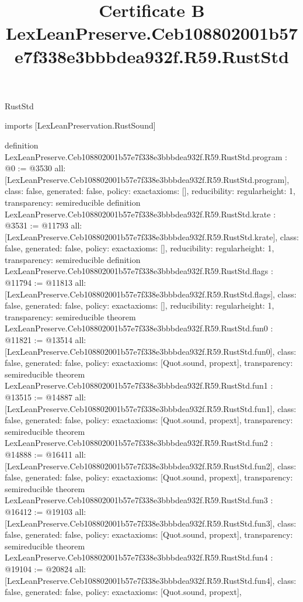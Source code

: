 \begin{lexlean}{RustStd}
\title{Certificate B LexLeanPreserve.Ceb108802001b57e7f338e3bbbdea932f.R59.RustStd}
\begin{coremodule}
imports [LexLeanPreservation.RustSound]

definition LexLeanPreserve.Ceb108802001b57e7f338e3bbbdea932f.R59.RustStd.program : @0 := @3530 {
  all: [LexLeanPreserve.Ceb108802001b57e7f338e3bbbdea932f.R59.RustStd.program],
  class: false,
  generated: false,
  policy: exact{axioms: []},
  reducibility: regular{height: 1},
  transparency: semireducible
}
definition LexLeanPreserve.Ceb108802001b57e7f338e3bbbdea932f.R59.RustStd.krate : @3531 := @11793 {
  all: [LexLeanPreserve.Ceb108802001b57e7f338e3bbbdea932f.R59.RustStd.krate],
  class: false,
  generated: false,
  policy: exact{axioms: []},
  reducibility: regular{height: 1},
  transparency: semireducible
}
definition LexLeanPreserve.Ceb108802001b57e7f338e3bbbdea932f.R59.RustStd.flags : @11794 := @11813 {
  all: [LexLeanPreserve.Ceb108802001b57e7f338e3bbbdea932f.R59.RustStd.flags],
  class: false,
  generated: false,
  policy: exact{axioms: []},
  reducibility: regular{height: 1},
  transparency: semireducible
}
theorem LexLeanPreserve.Ceb108802001b57e7f338e3bbbdea932f.R59.RustStd.fun0 : @11821 := @13514 {
  all: [LexLeanPreserve.Ceb108802001b57e7f338e3bbbdea932f.R59.RustStd.fun0],
  class: false,
  generated: false,
  policy: exact{axioms: [Quot.sound, propext]},
  transparency: semireducible
}
theorem LexLeanPreserve.Ceb108802001b57e7f338e3bbbdea932f.R59.RustStd.fun1 : @13515 := @14887 {
  all: [LexLeanPreserve.Ceb108802001b57e7f338e3bbbdea932f.R59.RustStd.fun1],
  class: false,
  generated: false,
  policy: exact{axioms: [Quot.sound, propext]},
  transparency: semireducible
}
theorem LexLeanPreserve.Ceb108802001b57e7f338e3bbbdea932f.R59.RustStd.fun2 : @14888 := @16411 {
  all: [LexLeanPreserve.Ceb108802001b57e7f338e3bbbdea932f.R59.RustStd.fun2],
  class: false,
  generated: false,
  policy: exact{axioms: [Quot.sound, propext]},
  transparency: semireducible
}
theorem LexLeanPreserve.Ceb108802001b57e7f338e3bbbdea932f.R59.RustStd.fun3 : @16412 := @19103 {
  all: [LexLeanPreserve.Ceb108802001b57e7f338e3bbbdea932f.R59.RustStd.fun3],
  class: false,
  generated: false,
  policy: exact{axioms: [Quot.sound, propext]},
  transparency: semireducible
}
theorem LexLeanPreserve.Ceb108802001b57e7f338e3bbbdea932f.R59.RustStd.fun4 : @19104 := @20824 {
  all: [LexLeanPreserve.Ceb108802001b57e7f338e3bbbdea932f.R59.RustStd.fun4],
  class: false,
  generated: false,
  policy: exact{axioms: [Quot.sound, propext]},
}
\end{coremodule}
\end{lexlean}
